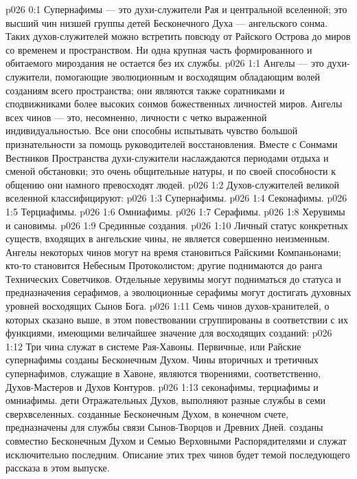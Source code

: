 \author{Совершенствователь Мудрости}
\vs p026 0:1 Супернафимы --- это духи\hyp{}служители Рая и центральной вселенной; это высший чин низшей группы детей Бесконечного Духа --- ангельского сонма. Таких духов\hyp{}служителей можно встретить повсюду от Райского Острова до миров со временем и пространством. Ни одна крупная часть формированного и обитаемого мироздания не остается без их службы.
\vs p026 1:1 Ангелы --- это духи\hyp{}служители, помогающие эволюционным и восходящим обладающим волей созданиям всего пространства; они являются также соратниками и сподвижниками более высоких сонмов божественных личностей миров. Ангелы всех чинов --- это, несомненно, личности с четко выраженной индивидуальностью. Все они способны испытывать чувство большой признательности за помощь руководителей восстановления. Вместе с Сонмами Вестников Пространства духи\hyp{}служители наслаждаются периодами отдыха и сменой обстановки; это очень общительные натуры, и по своей способности к общению они намного превосходят людей.
\vs p026 1:2 \pc Духов\hyp{}служителей великой вселенной классифицируют:
\vs p026 1:3 \bibnobreakspace Супернафимы.
\vs p026 1:4 \bibnobreakspace Секонафимы.
\vs p026 1:5 \bibnobreakspace Терциафимы.
\vs p026 1:6 \bibnobreakspace Омниафимы.
\vs p026 1:7 \bibnobreakspace Серафимы.
\vs p026 1:8 \bibnobreakspace Херувимы и сановимы.
\vs p026 1:9 \bibnobreakspace Срединные создания.
\vs p026 1:10 \pc Личный статус конкретных существ, входящих в ангельские чины, не является совершенно неизменным. Ангелы некоторых чинов могут на время становиться Райскими Компаньонами; кто\hyp{}то становится Небесным Протоколистом; другие поднимаются до ранга Технических Советчиков. Отдельные херувимы могут подниматься до статуса и предназначения серафимов, а эволюционные серафимы могут достигать духовных уровней восходящих Сынов Бога.
\vs p026 1:11 \pc Семь чинов духов\hyp{}хранителей, о которых сказано выше, в этом повествовании сгруппированы в соответствии с их функциями, имеющими величайшее значение для восходящих созданий:
\vs p026 1:12 \bibnobreakspace {} Три чина  служат в системе Рая\hyp{}Хавоны. Первичные, или Райские супернафимы созданы Бесконечным Духом. Чины вторичных и третичных супернафимов, служащие в Хавоне, являются творениями, соответственно, Духов\hyp{}Мастеров и Духов Контуров.
\vs p026 1:13 \pc {}\bibnobreakspace {} секонафимы, терциафимы и омниафимы.  дети Отражательных Духов, выполняют разные службы в семи сверхвселенных.  созданные Бесконечным Духом, в конечном счете, предназначены для службы связи Сынов\hyp{}Творцов и Древних Дней.  созданы совместно Бесконечным Духом и Семью Верховными Распорядителями и служат исключительно последним. Описание этих трех чинов будет темой последующего рассказа в этом выпуске.

